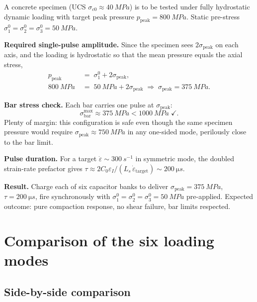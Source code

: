 \documentclass[11pt,a4paper,openany]{book}
\providecommand{\SI}[2]{\qty{#1}{#2}}
\theoremstyle{handbook}
\newcommand{\sig}{\sigma}
\newcommand{\eps}{\varepsilon}
\newcommand{\epsdot}{\dot\eps}
\newcommand{\Cz}{C_0}
\newcommand{\Ls}{L_s}
\newcommand{\sigpeak}{\sig_{\text{peak}}}
\begin{document}
A concrete specimen (UCS $\sig_{c0}\approx\SI{40}{MPa}$) is to be tested
under fully hydrostatic dynamic loading with target peak pressure
$p_{\text{peak}}=\SI{800}{MPa}$. Static pre-stress
$\sig_1^{0}=\sig_2^{0}=\sig_3^{0}=\SI{50}{MPa}$.

\textbf{Required single-pulse amplitude.} Since the specimen sees
$2\sigpeak$ on each axis, and the loading is hydrostatic so that the mean
pressure equals the axial stress,
\begin{align*}
  p_{\text{peak}} &\;=\; \sig_1^{0} + 2\sigpeak,\\
  \SI{800}{MPa} &\;=\; \SI{50}{MPa} + 2\sigpeak \;\Rightarrow\; \sigpeak=\SI{375}{MPa}.
\end{align*}

\textbf{Bar stress check.} Each bar carries one pulse at $\sigpeak$:
\[
  \sig_{\text{bar}}^{\max}\approx\SI{375}{MPa}<\SI{1000}{MPa}\;\checkmark.
\]
Plenty of margin: this configuration is safe even though the same specimen
pressure would require $\sigpeak\approx\SI{750}{MPa}$ in any one-sided
mode, perilously close to the bar limit.

\textbf{Pulse duration.} For a target $\epsdot\sim\SI{300}{s^{-1}}$ in
symmetric mode, the doubled strain-rate prefactor gives
$\tau\approx 2\Cz\eps_I/(\Ls\,\epsdot_{\text{target}})\sim\SI{200}{\micro s}$.

\textbf{Result.} Charge each of six capacitor banks to deliver
$\sigpeak=\SI{375}{MPa}$, $\tau=\SI{200}{\micro s}$, fire synchronously with
$\sig_1^{0}=\sig_2^{0}=\sig_3^{0}=\SI{50}{MPa}$ pre-applied. Expected
outcome: pure compaction response, no shear failure, bar limits
respected.


\chapter{Comparison of the six loading modes}\label{ch:comparison}

\section{Side-by-side comparison}
\end{document}
